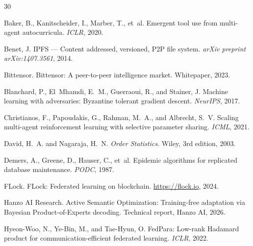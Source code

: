 
\begin{thebibliography}{30}

Baker, B., Kanitscheider, I., Marber, T., et~al.
\newblock Emergent tool use from multi-agent autocurricula.
\newblock \emph{ICLR}, 2020.

Benet, J.
\newblock IPFS --- Content addressed, versioned, P2P file system.
\newblock \emph{arXiv preprint arXiv:1407.3561}, 2014.

Bittensor.
\newblock Bittensor: A peer-to-peer intelligence market.
\newblock Whitepaper, 2023.

Blanchard, P., El~Mhamdi, E.~M., Guerraoui, R., and Stainer, J.
\newblock Machine learning with adversaries: Byzantine tolerant gradient
  descent.
\newblock \emph{NeurIPS}, 2017.

Christianos, F., Papoudakis, G., Rahman, M.~A., and Albrecht, S.~V.
\newblock Scaling multi-agent reinforcement learning with selective parameter
  sharing.
\newblock \emph{ICML}, 2021.

David, H.~A. and Nagaraja, H.~N.
\newblock \emph{Order Statistics}.
\newblock Wiley, 3rd edition, 2003.

Demers, A., Greene, D., Hauser, C., et~al.
\newblock Epidemic algorithms for replicated database maintenance.
\newblock \emph{PODC}, 1987.

FLock.
\newblock FLock: Federated learning on blockchain.
\newblock \url{https://flock.io}, 2024.

Hanzo AI Research.
\newblock Active Semantic Optimization: Training-free adaptation via Bayesian
  Product-of-Experts decoding.
\newblock Technical report, Hanzo AI, 2026.

Hyeon-Woo, N., Ye-Bin, M., and Tae-Hyun, O.
\newblock FedPara: Low-rank Hadamard product for communication-efficient
  federated learning.
\newblock \emph{ICLR}, 2022.


\end{thebibliography}
